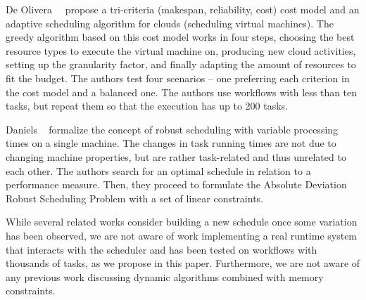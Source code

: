 \documentclass[conference]{IEEEtran}
\newcommand{\new}[1]{{#1}}
\begin{document}
De Olivera~\etal~\cite{de2012provenance} propose a tri-criteria (makespan, reliability, cost) \new{cost model and an adaptive
 scheduling algorithm for clouds (scheduling virtual machines).
The greedy algorithm based on this cost model  works in four steps, choosing the best resource types to execute the virtual
machine on, producing new cloud activities, setting up the granularity factor, and finally adapting the amount of resources
to fit the budget.}
The authors test four scenarios -- one preferring each criterion in the cost model and a balanced one.
The authors use workflows with less than ten tasks, but repeat them so that the execution has up to 200 tasks.


Daniels \etal~\cite{daniels1995robust} formalize the concept of robust scheduling with variable processing times
on a single machine.
The changes in task running times are not due to changing machine properties, but are rather task-related
and thus unrelated to each other.
The authors search for an optimal schedule
in relation to a performance measure. %
Then, they proceed to formulate the Absolute Deviation Robust Scheduling Problem \new{with} a set of linear constraints.
    

While several related works consider building a new schedule once some variation has been observed,
we are not aware of work implementing a real runtime system that interacts with the scheduler
and has been tested on workflows with thousands of tasks, as we propose in this paper. Furthermore, 
we are not aware of any previous work discussing dynamic algorithms combined with memory constraints. 
\end{document}
